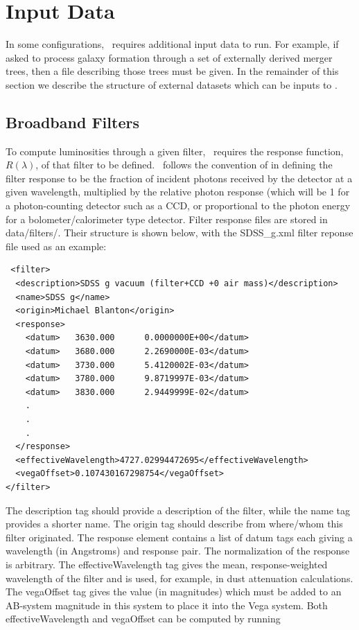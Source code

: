 \chapter{Input Data}

In some configurations, \glc\ requires additional input data to run. For example, if asked to process galaxy formation through a set of externally derived merger trees, then a file describing those trees must be given. In the remainder of this section we describe the structure of external datasets which can be inputs to \glc.

\section{Broadband Filters}

To compute luminosities through a given filter, \glc\ requires the response function, $R(\lambda)$, of that filter to be defined. \glc\ follows the convention of \cite{hogg_k_2002} in defining the filter response to be the fraction of incident photons received by the detector at a given wavelength, multiplied by the relative photon response (which will be 1 for a photon-counting detector such as a CCD, or proportional to the photon energy for a bolometer/calorimeter type detector. Filter response files are stored in {\normalfont \ttfamily data/filters/}. Their structure is shown below, with the {\normalfont \ttfamily SDSS\_g.xml} filter reponse file used as an example:
\begin{verbatim}
 <filter>
  <description>SDSS g vacuum (filter+CCD +0 air mass)</description>
  <name>SDSS g</name>
  <origin>Michael Blanton</origin>
  <response>
    <datum>   3630.000      0.0000000E+00</datum>
    <datum>   3680.000      2.2690000E-03</datum>
    <datum>   3730.000      5.4120002E-03</datum>
    <datum>   3780.000      9.8719997E-03</datum>
    <datum>   3830.000      2.9449999E-02</datum>
    .
    .
    . 
  </response>
  <effectiveWavelength>4727.02994472695</effectiveWavelength>
  <vegaOffset>0.107430167298754</vegaOffset>
</filter>
\end{verbatim}
The {\normalfont \ttfamily description} tag should provide a description of the filter, while the {\normalfont \ttfamily name} tag provides a shorter name. The {\normalfont \ttfamily origin} tag should describe from where/whom this filter originated. The {\normalfont \ttfamily response} element contains a list of {\normalfont \ttfamily datum} tags each giving a wavelength (in Angstroms) and response pair. The normalization of the response is arbitrary. The {\normalfont \ttfamily effectiveWavelength} tag gives the mean, response-weighted wavelength of the filter and is used, for example, in dust attenuation calculations. The {\normalfont \ttfamily vegaOffset} tag gives the value (in magnitudes) which must be added to an AB-system magnitude in this system to place it into the Vega system. Both {\normalfont \ttfamily effectiveWavelength} and {\normalfont \ttfamily vegaOffset} can be computed by running
